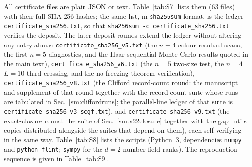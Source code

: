\documentclass[aps,prx,reprint,superscriptaddress,nobibnotes,longbibliography]{revtex4-2}
\begin{document}
All certificate files are plain JSON or text.  Table~\ref{tab:S7} lists them ($63$ files) with their full SHA-256 hashes; the same list, in \texttt{sha256sum} format, is the ledger \texttt{certificate\_sha256.txt}, so that \texttt{sha256sum -c certificate\_sha256.txt} verifies the deposit.  The later deposit rounds extend the ledger without altering any entry above: \texttt{certificate\_sha256\_v5.txt} (the $n=4$ colour-resolved scans, the first $n=5$ diagnostics, and the Haar sequential-Monte-Carlo results quoted in the main text), \texttt{certificate\_sha256\_v6.txt} (the $n=5$ two-size test, the $n=4$ $L=10$ third crossing, and the no-freezing-theorem verification), \texttt{certificate\_sha256\_v8.txt} (the Clifford record-count round: the manuscript and supplement of that round together with the record-count suite whose runs are tabulated in Sec.~\ref{sm:cliffordruns}; the parallel-line ledger of that suite is \texttt{certificate\_sha256\_v3\_scgf.txt}), and \texttt{certificate\_sha256\_v9.txt} (the exact-closure round: the suite of Sec.~\ref{sm:v22closure} together with the gap\_utils copies distributed alongside the suites that depend on them), each self-verifying in the same way.  Table~\ref{tab:S8} lists the scripts (Python~3, dependencies \texttt{numpy} and \texttt{python-flint}; \texttt{sympy} for the $d=2$ number-field ranks).  The reproduction sequence is given in Table~\ref{tab:S9}.
\end{document}
